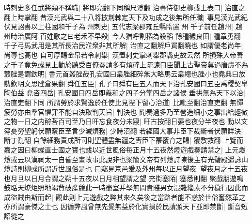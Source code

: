 時刺史多任武將類不稱職|{
	將即亮翻下同稱尺澄翻}
治書侍御史柳彧上表曰|{
	治直之翻上時掌翻}
昔漢光武與二十八將披荆棘定天下及功成之後無所任職|{
	事見漢光武紀}
伏見詔書以上柱國和千子為州刺史|{
	五代志梁郡雍丘縣隋置州}
千子前任趙州|{
	趙州時治廣阿}
百姓歌之曰老禾不早殺|{
	今人猶呼割稻為殺稻}
餘種穢良田|{
	種章勇翻}
千子弓馬武用是其所長治民涖衆非其所解|{
	治直之翻解戶買翻曉也}
如謂優老尚年|{
	尚尊也高也}
自可厚賜金帛若令刺舉|{
	漢置刺史掌刺舉郡縣吏故云然}
所損殊大帝善之千子竟免彧見上勤於聽受百僚奏請多有煩碎上疏諫曰臣聞上古聖帝莫過唐虞不為樷脞是謂欽明|{
	書元首叢脞哉孔安國曰叢脞細碎無大略馬云叢總也脞小也堯典曰放勲欽明文思脞倉果翻}
舜任五臣|{
	孔子曰舜有臣五人而天下治孔安國曰五臣禹稷契臯陶伯益}
堯咨四岳|{
	孔安國曰四岳即羲和之四子分掌四岳之諸侯}
垂拱無為天下以治|{
	治直吏翻下同}
所謂勞於求賢逸於任使比見陛下留心治道|{
	比毗至翻治直吏翻}
無憚疲勞亦由羣官懼罪不能自決取判天旨|{
	判決也}
聞奏過多乃至營造細小之事出給輕微之物一日之内酧荅百司至乃日旰忘食夜分未寢|{
	旰古按翻日晏也夜分半夜也}
動以文簿憂勞聖躬伏願察臣至言少減煩務|{
	少詩沼翻}
若經國大事非臣下裁斷者伏願詳決|{
	斷丁亂翻}
自餘細務責成所司則聖體盡無疆之夀臣下蒙覆育之賜|{
	覆敷救翻}
上覽而嘉之因曰柳彧直士國之寶也彧以近世風俗每正月十五夜然燈遊戲奏請禁之|{
	上元燃燈或云以漢祠太一自昏至晝故事此說非也梁簡文帝有列燈詩陳後主有光璧殿遥詠山燈詩則柳彧所謂近世風俗是也}
曰竊見京邑爰及外州每以正月望夜|{
	望夜月之十五夜也月旦以日月合謂之朔十五夜以日月相望謂之望}
充街塞陌|{
	塞悉則翻}
聚戲朋遊鳴鼓聒天燎炬照地竭貲破產競此一時盡室并孥無問貴賤男女混雜緇素不分穢行因此而成盜賊由斯而起|{
	觀此則上元遊戲之弊其來久矣後之當路者能不惑於世俗奮然革之亦所謂豪傑之士也}
因循弊風曾無先覺無益於化實損於民請頒天下並即禁斷|{
	斷音短}
詔從之

